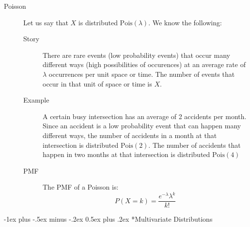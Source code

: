 \documentclass[10pt,landscape]{article}
\makeatletter
\theoremstyle{definition}
\newcommand{\Pois}{\textrm{Pois}}
\renewcommand{\section}{\@startsection{section}{1}{0mm}%
                                {-1ex plus -.5ex minus -.2ex}%
                                {0.5ex plus .2ex}%
                                {\normalfont\large\bfseries}}
\makeatother
\begin{document}
\begin{multicols}{3}
\begin{description}
\item[Poisson] Let us say that $X$ is distributed $\Pois(\lambda)$. We know the following:
\begin{description}
    \item[Story] There are rare events (low probability events) that occur many different ways (high possibilities of occurences) at an average rate of $\lambda$ occurrences per unit space or time. The number of events that occur in that unit of space or time is $X$.
    
    \item[Example] A certain busy intersection has an average of 2 accidents per month. Since an accident is a low probability event that can happen many different ways, the number of accidents in a month at that intersection is distributed $\Pois(2)$. The number of accidents that happen in two months at that intersection is distributed $\Pois(4)$
    
    \item[PMF] The PMF of a Poisson is:
\[P(X = k) = \frac{e^{-\lambda}\lambda^k}{k!}\]
\end{description}
\end{description}





\section*{Multivariate Distributions}


\end{multicols}
\end{document}
